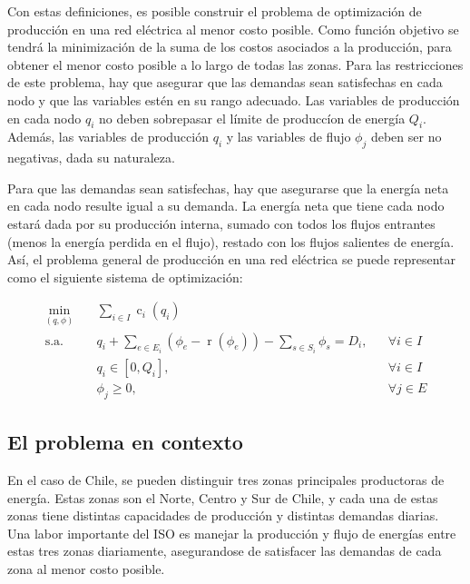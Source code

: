 \documentclass[12pt,twoside]{article}
\begin{document}
	\hspace{1cm} Con estas definiciones, es posible construir el problema de optimizaci\'on de producci\'on en una red el\'ectrica al menor costo posible. Como funci\'on objetivo se tendr\'a la minimizaci\'on de la suma de los costos asociados a la producci\'on, para obtener el menor costo posible a lo largo de todas las zonas. Para las restricciones de este problema, hay que asegurar que las demandas sean satisfechas en cada nodo y que las variables est\'en en su rango adecuado. Las variables de producci\'on en cada nodo \(q_i\) no deben sobrepasar el l\'imite de producc\'ion de energ\'ia \(Q_i\). Adem\'as, las variables de producci\'on \(q_i\) y las variables de flujo \(\phi_j\) deben ser no negativas, dada su naturaleza.
	
	\hspace{1cm} Para que las demandas sean satisfechas, hay que asegurarse que la energ\'ia neta en cada nodo resulte igual a su demanda. La energ\'ia neta que tiene cada nodo estar\'a dada por su producci\'on interna, sumado con todos los flujos entrantes (menos la energ\'ia perdida en el flujo), restado con los flujos salientes de energ\'ia. As\'i, el problema general de producci\'on en una red el\'ectrica se puede representar como el siguiente sistema de optimizaci\'on:
	
	\begin{equation*}\begin{aligned}
		\min_{(q,\phi)} \quad & \sum_{i\in I}\operatorname{c}_i(q_i) \\
		\textrm{s.a.} \quad & q_i+\sum_{e\in E_i}\left(\phi_e-\operatorname{r}(\phi_e)\right)-\sum_{s\in S_i}\phi_s=D_i, & & \forall i \in I \\
		& q_i\in[0,Q_i], & & \forall i \in I \\
		& \phi_j\geq0, & & \forall j \in E
	\end{aligned}\end{equation*}
	
	\subsection{El problema en contexto}	
	\hspace{1cm} En el caso de Chile, se pueden distinguir tres zonas principales productoras de energ\'ia. Estas zonas son el Norte, Centro y Sur de Chile, y cada una de estas zonas tiene distintas capacidades de producci\'on y distintas demandas diarias. Una labor importante del ISO es manejar la producci\'on y flujo de energ\'ias entre estas tres zonas diariamente, asegurandose de satisfacer las demandas de cada zona al menor costo posible.
	
\end{document}
